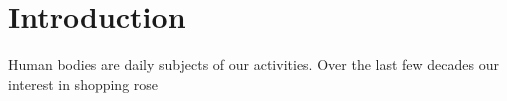 \chapter*{Introduction}
Human bodies are daily subjects of our activities. Over the last few decades our interest in shopping rose